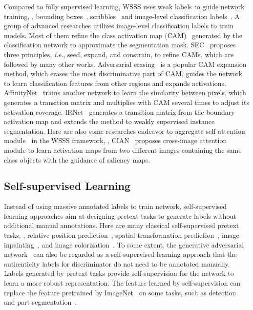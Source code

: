 \documentclass[10pt,twocolumn,letterpaper]{article}
\begin{document}
	Compared to fully supervised learning, WSSS uses weak labels to guide network training, \eg, bounding boxes~\cite{boxsup, SDI}, scribbles~\cite{scribblesup, RAWK} and image-level classification labels~\cite{SEC, CCNN, MIL}. A group of advanced researches utilizes image-level classification labels to train models. Most of them refine the class activation map (CAM)~\cite{CAM} generated by the classification network to approximate the segmentation mask. SEC~\cite{SEC} proposes three principles, \textit{i}.\textit{e}., seed, expand, and constrain, to refine CAMs, which are followed by many other works. Adversarial erasing~\cite{SeeNet, AdvErasing} is a popular CAM expansion method, which erases the most discriminative part of CAM, guides the network to learn classification features from other regions and expands activations. AffinityNet~\cite{AffinityNet} trains another network to learn the similarity between pixels, which generates a transition matrix and multiplies with CAM several times to adjust its activation coverage. IRNet~\cite{IRNet} generates a transition matrix from the boundary activation map and extends the method to weakly supervised instance segmentation. Here are also some researches endeavor to aggregate self-attention module~\cite{selfattention, nonlocal} in the WSSS framework, \eg, CIAN~\cite{CIAN} proposes cross-image attention module to learn activation maps from two different images containing the same class objects with the guidance of saliency maps.
	
	\subsection{Self-supervised Learning}
	
	Instead of using massive annotated labels to train network, self-supervised learning approaches aim at designing pretext tasks to generate labels without additional manual annotations. Here are many classical self-supervised pretext tasks, \eg, relative position prediction~\cite{doersch2015unsupervised}, spatial transformation prediction~\cite{gidaris2018unsupervised}, image inpainting~\cite{pathak2016context}, and image colorization~\cite{larsson2016learning}. To some extent, the generative adversarial network~\cite{GAN} can also be regarded as a self-supervised learning approach that the authenticity labels for discriminator do not need to be annotated manually. Labels generated by pretext tasks provide self-supervision for the network to learn a more robust representation. The feature learned by self-supervision can replace the feature pretrained by ImageNet~\cite{imagenet} on some tasks, such as detection~\cite{doersch2015unsupervised} and part segmentation~\cite{SCOPS}. 
	
\end{document}
